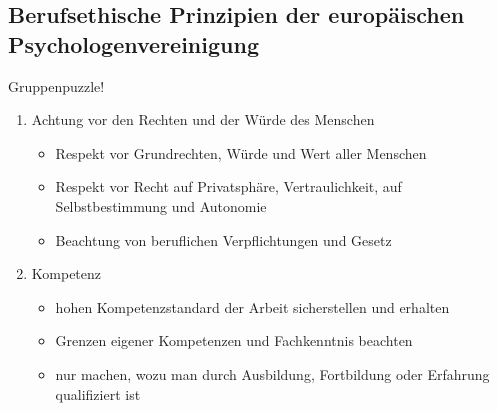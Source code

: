 \documentclass[
]{book}
\providecommand{\tightlist}{%
  \setlength{\itemsep}{0pt}\setlength{\parskip}{0pt}}
\begin{document}
\hypertarget{berufsethische-prinzipien-der-europuxe4ischen-psychologenvereinigung}{%
\subsection{Berufsethische Prinzipien der europäischen Psychologenvereinigung}\label{berufsethische-prinzipien-der-europuxe4ischen-psychologenvereinigung}}

Gruppenpuzzle!

\begin{enumerate}
\def\labelenumi{\arabic{enumi}.}
\item
  Achtung vor den Rechten und der Würde des Menschen

  \begin{itemize}
  \tightlist
  \item
    Respekt vor Grundrechten, Würde und Wert aller Menschen
  \item
    Respekt vor Recht auf Privatsphäre, Vertraulichkeit, auf Selbstbestimmung und Autonomie
  \item
    Beachtung von beruflichen Verpflichtungen und Gesetz
  \end{itemize}
\item
  Kompetenz

  \begin{itemize}
  \tightlist
  \item
    hohen Kompetenzstandard der Arbeit sicherstellen und erhalten
  \item
    Grenzen eigener Kompetenzen und Fachkenntnis beachten
  \item
    nur machen, wozu man durch Ausbildung, Fortbildung oder Erfahrung qualifiziert ist
  \end{itemize}
\end{enumerate}
\end{document}

